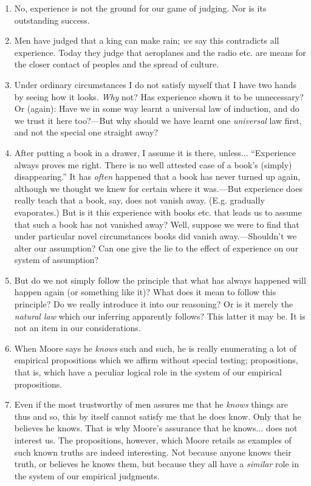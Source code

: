 \documentclass{book}
\begin{document}
\begin{enumerate}
\item
No, experience is not the ground for our game of judging. Nor is its
outstanding success.

\item
Men have judged that a king can make rain; \emph{we} say this contradicts all
experience. Today they judge that aeroplanes and the radio etc. are means for
the closer contact of peoples and the spread of culture.

\item
Under ordinary circumstances I do not satisfy myself that I have two hands by
seeing how it looks. \emph{Why} not? Has experience shown it to be unnecessary?
Or (again): Have we in some way learnt a universal law of induction, and do we
trust it here too?---But why should we have learnt one \emph{universal} law
first, and not the special one straight away?

\item
After putting a book in a drawer, I assume it is there, unless... ``Experience
always proves me right. There is no well attested case of a book's (simply)
disappearing.'' It has \emph{often} happened that a book has never turned up
again, although we thought we knew for certain where it was.---But experience
does really teach that a book, say, does not vanish away. (E.g. gradually
evaporates.) But is it this experience with books etc. that leads us to assume
that such a book has not vanished away? Well, suppose we were to find that
under particular novel circumstances books did vanish away.---Shouldn't we
alter our assumption? Can one give the lie to the effect of experience on our
system of assumption?

\item
But do we not simply follow the principle that what has always happened will
happen again (or something like it)? What does it mean to follow this
principle? Do we really introduce it into our reasoning? Or is it merely the
\emph{natural law} which our inferring apparently follows? This latter it may
be. It is not an item in our considerations.

\item
When Moore says he \emph{knows} such and such, he is really enumerating a lot
of empirical propositions which we affirm without special testing;
propositions, that is, which have a peculiar logical role in the system of our
empirical propositions.

\item
Even if the most trustworthy of men assures me that he \emph{knows} things are
thus and so, this by itself cannot satisfy me that he does know. Only that he
believes he knows. That is why Moore's assurance that he knows... does not
interest us. The propositions, however, which Moore retails as examples of such
known truths are indeed interesting. Not because anyone knows their truth, or
believes he knows them, but because they all have a \emph{similar} role in the
system of our empirical judgments.


\end{enumerate}
\end{document}
